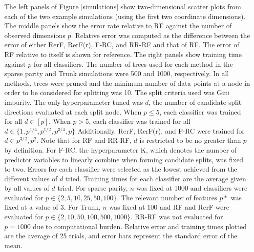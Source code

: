 \documentclass{article}
\begin{document}
The left panels of Figure \ref{simulations} show two-dimensional scatter plots from each of the two example simulations (using the first two coordinate dimensions). The middle panels show the error rate relative to RF against the number of observed dimensions $p$. Relative error was computed as the difference between the error of either RerF, RerF(r), F-RC, and RR-RF and that of RF. The error of RF relative to itself is shown for reference. The right panels show training time against $p$ for all classifiers. The number of trees used for each method in the sparse parity and Trunk simulations were 500 and 1000, respectively. In all methods, trees were pruned and the minimum number of data points at a node in order to be considered for splitting was 10. The split criteria used was Gini impurity. The only hyperparameter tuned was $d$, the number of candidate split directions evaluated at each split node. When $p \leq 5$, each classifier was trained for all $d \in [p]$. When $p > 5$, each classifier was trained for all $d \in \{1,p^{1/4},p^{1/2},p^{3/4},p\}$ Additionally, RerF, RerF(r), and F-RC were trained for $d \in {p^{3/2},p^2}$. Note that for RF and RR-RF, $d$ is restricted to be no greater than $p$ by definition. For F-RC, the hyperparameter K, which denotes the number of predictor variables to linearly combine when forming candidate splits, was fixed to two. Errors for each classifier were selected as the lowest achieved from the different values of $d$ tried. Training times for each classifier are the average given by all values of $d$ tried. For sparse parity, $n$ was fixed at 1000 and classifiers were evaluated for $p \in \{2,5,10,25,50,100\}$. The relevant number of features $p*$ was fixed at a value of 3. For Trunk, $n$ was fixed at 100 and RF and RerF were evaluated for $p \in \{2,10,50,100,500,1000\}$. RR-RF was not evaluated for $p = 1000$ due to computational burden. Relative error and training times plotted are the average of 25 trials, and error bars represent the standard error of the mean.
\end{document}
